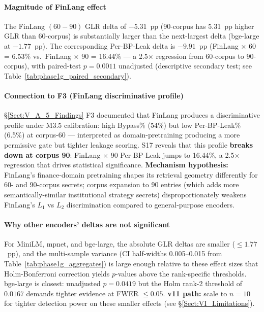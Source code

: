 \documentclass[journal]{IEEEtran}
\begin{document}
\paragraph{Magnitude of FinLang effect}
The FinLang $(60{-}90)$ GLR delta of $-5.31$~pp (90-corpus has 5.31~pp higher GLR than 60-corpus) is substantially larger than the next-largest delta (bge-large at $-1.77$~pp). The corresponding Per-BP-Leak delta is $-9.91$~pp (FinLang $\times$ 60 = 6.53\% vs.\ FinLang $\times$ 90 = 16.44\% --- a 2.5$\times$ regression from 60-corpus to 90-corpus), with paired-test $p{=}0.0011$ unadjusted (descriptive secondary test; see Table~\ref{tab:phase1g_paired_secondary}).

\paragraph{Connection to F3 (FinLang discriminative profile)}
\S\ref{Sect:V_A_5_Findings} F3 documented that FinLang produces a discriminative profile under M3.5 calibration: high Bypass\% (54\%) but low Per-BP-Leak\% (6.5\%) at corpus-60 --- interpreted as domain-pretraining producing a more permissive gate but tighter leakage scoring. S17 reveals that this profile \textbf{breaks down at corpus 90}: FinLang $\times$ 90 Per-BP-Leak jumps to 16.44\%, a 2.5$\times$ regression that drives statistical significance. \textbf{Mechanism hypothesis:} FinLang's finance-domain pretraining shapes its retrieval geometry differently for 60- and 90-corpus secrets; corpus expansion to 90 entries (which adds more semantically-similar institutional strategy secrets) disproportionately weakens FinLang's $L_1$ vs $L_2$ discrimination compared to general-purpose encoders.

\paragraph{Why other encoders' deltas are not significant}
For MiniLM, mpnet, and bge-large, the absolute GLR deltas are smaller ($\leq 1.77$~pp), and the multi-sample variance (CI half-widths 0.005--0.015 from Table~\ref{tab:phase1g_aggregates}) is large enough relative to these effect sizes that Holm-Bonferroni correction yields $p$-values above the rank-specific thresholds. bge-large is closest: unadjusted $p{=}0.0419$ but the Holm rank-2 threshold of $0.0167$ demands tighter evidence at FWER $\leq 0.05$. \textbf{v11 path:} scale to $n{=}10$ for tighter detection power on these smaller effects (see \S\ref{Sect:VI_Limitations}).
\end{document}
